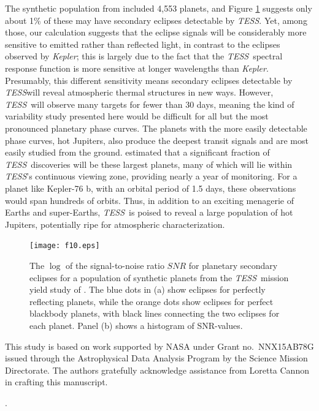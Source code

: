 \documentclass[manuscript]{aastex62}
\newcommand{\kepler}{{\it Kepler}}
\newcommand{\tess}{{\it TESS}}
\begin{document}
The synthetic population from \citet{2018ApJS..239....2B} included 4,553 planets, and Figure \ref{fig:eclipse_estimates} suggests only about 1\% of these may have secondary eclipses detectable by \tess. Yet, among those, our calculation suggests that the eclipse signals will be considerably more sensitive to emitted rather than reflected light, in contrast to the eclipses observed by \kepler; this is largely due to the fact that the \tess\ spectral response function is more sensitive at longer wavelengths than \kepler. Presumably, this different sensitivity means secondary eclipses detectable by \tess will reveal atmospheric thermal structures in new ways. However, \tess\ will observe many targets for fewer than 30 days, meaning the kind of variability study presented here would be difficult for all but the most pronounced planetary phase curves. The planets with the more easily detectable phase curves, hot Jupiters, also produce the deepest transit signals and are most easily studied from the ground. \citet{2018ApJS..239....2B} estimated that a significant fraction of \tess\ discoveries will be these largest planets, many of which will lie within \tess's continuous viewing zone, providing nearly a year of monitoring. For a planet like Kepler-76 b, with an orbital period of 1.5 days, these observations would span hundreds of orbits. Thus, in addition to an exciting menagerie of Earths and super-Earths, \tess\ is poised to reveal a large population of hot Jupiters, potentially ripe for atmospheric characterization. 

\begin{figure}
\texttt{[image: f10.eps]}
\caption{The $\log$ of the signal-to-noise ratio $SNR$ for planetary secondary eclipses for a population of synthetic planets from the \tess\ mission yield study of \citet{2018ApJS..239....2B}. The blue dots in (a) show eclipses for perfectly reflecting planets, while the orange dots show eclipses for perfect blackbody planets, with black lines connecting the two eclipses for each planet. Panel (b) shows a histogram of SNR-values. \label{fig:eclipse_estimates}}
\end{figure}

\acknowledgments 
This study is based on work supported by NASA under Grant no.~NNX15AB78G issued through the Astrophysical Data Analysis Program by the Science Mission Directorate. The authors gratefully acknowledge assistance from Loretta Cannon in crafting this manuscript.



.



\end{document}
